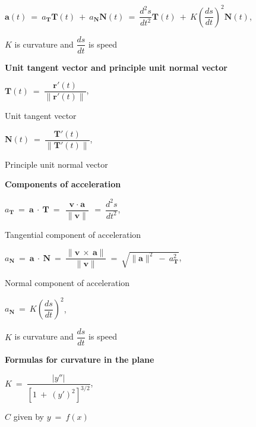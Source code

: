 \documentclass{article}
\begin{document}
\begin{large}
\hspace{0.2in} $\textbf{a}(t)\ =\ a_{\textbf{T}}\textbf{T}(t)\ +\ a_{\textbf{N}}\textbf{N}(t)\ =\ \dfrac{d^{2}s}{dt^{2}}\textbf{T}(t)\ +\ K\left(\dfrac{ds}{dt}\right)^{2}\textbf{N}(t)$, \begin{Large} $K$ is curvature and $\dfrac{ds}{dt}$ is speed \end{Large}

\hspace{0.1in} \textbf{Unit tangent vector and principle unit normal vector}

\hspace{1.5in} $\textbf{T}(t)\ =\ \dfrac{\textbf{r}'(t)}{\|\textbf{r}'(t)\|}$, \begin{Large} Unit tangent vector \end{Large}

\hspace{1.5in} $\textbf{N}(t)\ =\ \dfrac{\textbf{T}'(t)}{\|\textbf{T}'(t)\|}$, \begin{Large} Principle unit normal vector \end{Large}

\hspace{0.1in} \textbf{Components of acceleration}

\hspace{0.2in} $a_{\textbf{T}}\ =\ \textbf{a}\ \cdot\ \textbf{T}\ =\ \dfrac{\textbf{v}\ \cdot\ \textbf{a}}{\|\textbf{v}\|}\ =\ \dfrac{d^{2}s}{dt^{2}}$, \begin{Large} Tangential component of acceleration \end{Large}

\hspace{0.2in} $a_{\textbf{N}}\ =\ \textbf{a}\ \cdot\ \textbf{N}\ =\ \dfrac{\|\textbf{v}\ \times\ \textbf{a}\|}{\|\textbf{v}\|}\ =\ \sqrt{\|\textbf{a}\|^{2}\ -\ a_{\textbf{T}}^{2}}$, \begin{large} Normal component of acceleration \end{large}

\hspace{0.2in} $a_{\textbf{N}}\ =\ K\left(\dfrac{ds}{dt}\right)^{2}$, \begin{Large} $K$ is curvature and $\dfrac{ds}{dt}$ is speed \end{Large}

\hspace{0.1in} \textbf{Formulas for curvature in the plane}

\hspace{0.5in} $K\ =\ \dfrac{|y''|}{[1\ +\ (y')^{2}]^{3/2}}$, \begin{Large} $C$ given by $y\ =\ f(x)$ \end{Large}


\end{large}
\end{document}

